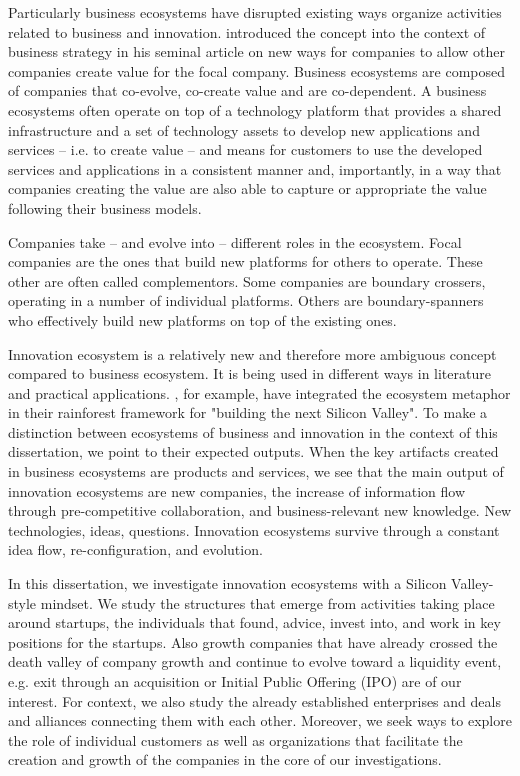 Particularly business ecosystems have disrupted existing ways organize activities related to business and innovation.  \cite{Moore1993} introduced the concept into the context of business strategy in his seminal article on new ways for companies to allow other companies create value for the focal company. Business ecosystems are composed of companies that co-evolve, co-create value and are co-dependent. A business ecosystems often operate on top of a technology platform that provides a shared infrastructure and a set of technology assets to develop new applications and services -- i.e. to create value -- and means for customers to use the developed services and applications in a consistent manner and, importantly, in a way that companies creating the value are also able to capture or appropriate the value following their business models.  

Companies take – and evolve into – different roles in the ecosystem. Focal companies are the ones that build new platforms for others to operate. These other are often called complementors. Some companies are boundary crossers, operating in a number of individual platforms. Others are boundary-spanners who effectively build new platforms on top of the existing ones. \citep{Jarvi2013} 

Innovation ecosystem is a relatively new and therefore more ambiguous concept compared to business ecosystem. It is being used in different ways in literature and practical applications. \cite{Hwang2012}, for example, have integrated the ecosystem metaphor in their rainforest framework for "building the next Silicon Valley". To make a distinction between ecosystems of business and innovation in the context of this dissertation, we point to their expected outputs. When the key artifacts created in business ecosystems are products and services, we see that the main output of innovation ecosystems are new companies, the increase of information flow through pre-competitive collaboration, and business-relevant new knowledge. New technologies, ideas, questions. Innovation ecosystems survive through a constant idea flow, re-configuration, and evolution.

In this dissertation, we investigate innovation ecosystems with a Silicon Valley-style mindset. We study the structures that emerge from activities taking place around startups, the individuals that found, advice, invest into, and work in key positions for the startups. Also growth companies that have already crossed the death valley of company growth and continue to evolve toward a liquidity event, e.g. exit through an acquisition or Initial Public Offering (IPO) are of our interest. For context, we also study the already established enterprises and deals and alliances connecting them with each other. Moreover, we seek ways to explore the role of individual customers as well as organizations that facilitate the creation and growth of the companies in the core of our investigations. 

